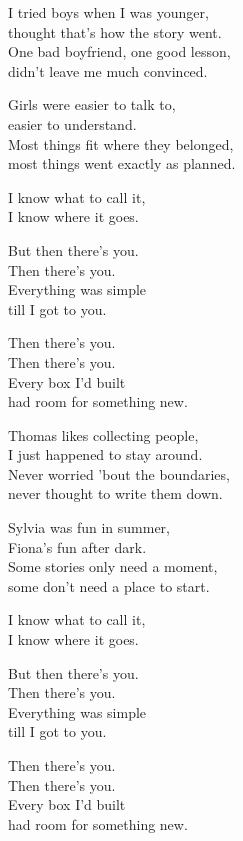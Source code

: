 \begin{lyrics}
I tried boys when I was younger,\\
thought that's how the story went.\\
One bad boyfriend, one good lesson,\\
didn't leave me much convinced.

Girls were easier to talk to,\\
easier to understand.\\
Most things fit where they belonged,\\
most things went exactly as planned.

I know what to call it,\\
I know where it goes.

But then there's you.\\
Then there's you.\\
Everything was simple\\
till I got to you.

Then there's you.\\
Then there's you.\\
Every box I'd built\\
had room for something new.

Thomas likes collecting people,\\
I just happened to stay around.\\
Never worried 'bout the boundaries,\\
never thought to write them down.

Sylvia was fun in summer,\\
Fiona's fun after dark.\\
Some stories only need a moment,\\
some don't need a place to start.

I know what to call it,\\
I know where it goes.

But then there's you.\\
Then there's you.\\
Everything was simple\\
till I got to you.

Then there's you.\\
Then there's you.\\
Every box I'd built\\
had room for something new.


\end{lyrics}
